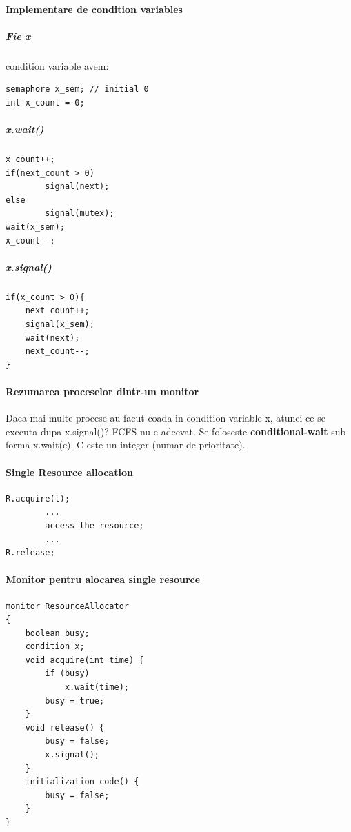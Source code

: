 \documentclass{article}
\begin{document}
\paragraph*{Implementare de condition variables}
\subparagraph*{Fie x} condition variable avem:
\begin{center}
    \begin{lstlisting}
semaphore x_sem; // initial 0
int x_count = 0;
    \end{lstlisting}
\end{center}
\subparagraph*{x.wait()}
\begin{center}
    \begin{lstlisting}
x_count++;
if(next_count > 0)
        signal(next);
else
        signal(mutex);
wait(x_sem);
x_count--;
    \end{lstlisting}
\end{center}
\subparagraph*{x.signal()}
\begin{center}
    \begin{lstlisting}
if(x_count > 0){
    next_count++;
    signal(x_sem);
    wait(next);
    next_count--;
}
    \end{lstlisting}
\end{center}

\paragraph*{Rezumarea proceselor dintr-un monitor} Daca mai multe procese au facut coada in condition variable x, atunci ce se executa dupa x.signal()? FCFS nu e adecvat. Se foloseste \textbf{conditional-wait} sub forma x.wait(c). C este un integer (numar de prioritate).

\paragraph*{Single Resource allocation}
\begin{center}
    \begin{lstlisting}
R.acquire(t);
        ...
        access the resource;
        ...
R.release;
    \end{lstlisting}
\end{center}
\paragraph*{Monitor pentru alocarea single resource}
\begin{center}
    \begin{lstlisting}
monitor ResourceAllocator 
{ 
    boolean busy; 
    condition x; 
    void acquire(int time) { 
        if (busy) 
            x.wait(time); 
        busy = true; 
    } 
    void release() { 
        busy = false; 
        x.signal(); 
    } 
    initialization code() {
        busy = false; 
    }
}		
\end{lstlisting}
\end{center}
\end{document}
